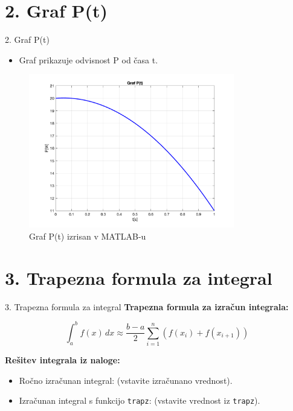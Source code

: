 \documentclass{beamer}
\begin{document}
\section{2. Graf P(t)}
\begin{frame}{2. Graf P(t)}
    \begin{itemize}
        \item Graf prikazuje odvisnost P od časa t.
    \end{itemize}
    
    \begin{figure}
        \centering
        \includegraphics[width=0.8\textwidth]{Graf_P_t.png} %
        \caption{Graf P(t) izrisan v MATLAB-u}
    \end{figure}
\end{frame}

\section{3. Trapezna formula za integral}
\begin{frame}{3. Trapezna formula za integral}
    \textbf{Trapezna formula za izračun integrala:}
    
    \[
    \int_a^b f(x) \, dx \approx \frac{b - a}{2} \sum_{i=1}^{n} (f(x_i) + f(x_{i+1}))
    \]
    
    \vspace{1em}
    
    \textbf{Rešitev integrala iz naloge:}
    \begin{itemize}
        \item Ročno izračunan integral: (vstavite izračunano vrednost).
        \item Izračunan integral s funkcijo \texttt{trapz}: (vstavite vrednost iz \texttt{trapz}).
    \end{itemize}
\end{frame}
\end{document}

